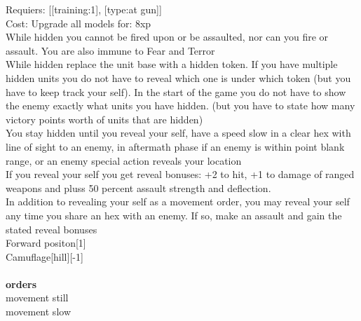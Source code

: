 Requiers: [[training:1], [type:at gun]] \\
Cost: Upgrade all models for: 8xp \\
While hidden you cannot be fired upon or be assaulted, nor can you fire or assault. You are also immune to Fear and Terror\\ 
While hidden replace the unit base with a hidden token. If you have multiple hidden units you do not have to reveal which one is under which token (but you have to keep track your self). In the start of the game you do not have to show the enemy exactly what units you have hidden. (but you have to state how many victory points worth of units that are hidden)\\ 
You stay hidden until you reveal your self, have a speed slow in a clear hex with line of sight to an enemy, in aftermath phase if an enemy is within point blank range, or an enemy special action reveals your location\\ 
If you reveal your self you get reveal bonuses: +2 to hit, +1 to damage of ranged weapons and pluss 50 percent assault strength and deflection.\\ 
In addition to revealing your self as a movement order, you may reveal your self any time you share an hex with an enemy. If so, make an assault and gain the stated reveal bonuses\\ 
Forward positon[1]\\ 
Camuflage[hill][-1]\\ 








\ \\ {\bf orders } \\
movement still \\
movement slow \\

